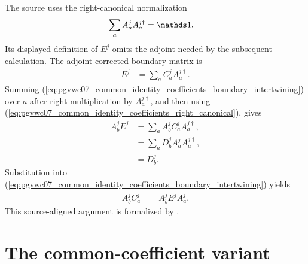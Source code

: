 \documentclass{article}
\begin{document}
The source uses the right-canonical normalization
\begin{align}
    \sum_a A_a^j A_a^{j\dagger}
        &= \Id.
    \label{eq:pgvwc07_common_identity_coefficients_right_canonical}
\end{align}
Its displayed definition of $E^j$ omits the adjoint needed by the subsequent
calculation. The adjoint-corrected boundary matrix is
\begin{align}
    E^j
        &= \sum_a C_a^j A_a^{j\dagger}.
    \label{eq:pgvwc07_common_identity_coefficients_corrected_boundary_matrix}
\end{align}
Summing
(\ref{eq:pgvwc07_common_identity_coefficients_boundary_intertwining}) over $a$
after right multiplication by $A_a^{j\dagger}$, and then using
(\ref{eq:pgvwc07_common_identity_coefficients_right_canonical}), gives
\begin{align}
    A_b^j E^j
        &= \sum_a A_b^j C_a^j A_a^{j\dagger},
    \label{eq:pgvwc07_common_identity_coefficients_boundary_sum_left}\\
        &= \sum_a D_b^j A_a^j A_a^{j\dagger},
    \label{eq:pgvwc07_common_identity_coefficients_boundary_sum_intertwined}\\
        &= D_b^j.
    \label{eq:pgvwc07_common_identity_coefficients_boundary_factorization}
\end{align}
Substitution into
(\ref{eq:pgvwc07_common_identity_coefficients_boundary_intertwining}) yields
\begin{align}
    A_b^j C_a^j
        &= A_b^j E^j A_a^j.
    \label{eq:pgvwc07_common_identity_coefficients_source_boundary_identity}
\end{align}
This source-aligned argument is formalized by
.

\section{The common-coefficient variant}
\end{document}
